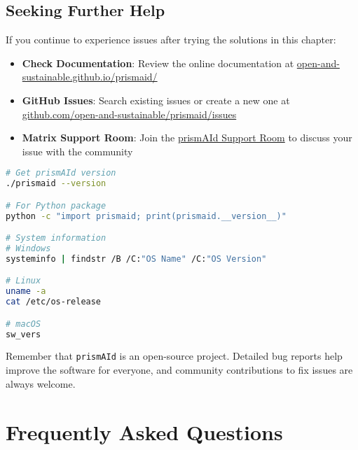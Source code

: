 \section{Seeking Further Help}

If you continue to experience issues after trying the solutions in this chapter:

\begin{itemize}
    \item \textbf{Check Documentation}: Review the online documentation at \href{https://open-and-sustainable.github.io/prismaid/}{open-and-sustainable.github.io/prismaid/}

    \item \textbf{GitHub Issues}: Search existing issues or create a new one at \href{https://github.com/open-and-sustainable/prismaid/issues}{github.com/open-and-sustainable/prismaid/issues}

    \item \textbf{Matrix Support Room}: Join the \href{https://matrix.to/#/#prismAId-support:matrix.org}{prismAId Support Room} to discuss your issue with the community
\end{itemize}


\begin{commandbox}
\begin{lstlisting}[language=Bash]
# Get prismAId version
./prismaid --version

# For Python package
python -c "import prismaid; print(prismaid.__version__)"

# System information
# Windows
systeminfo | findstr /B /C:"OS Name" /C:"OS Version"

# Linux
uname -a
cat /etc/os-release

# macOS
sw_vers
\end{lstlisting}
\end{commandbox}

Remember that \texttt{prismAId} is an open-source project. Detailed bug reports help improve the software for everyone, and community contributions to fix issues are always welcome.

\chapter{Frequently Asked Questions} \label{chap:faq}

